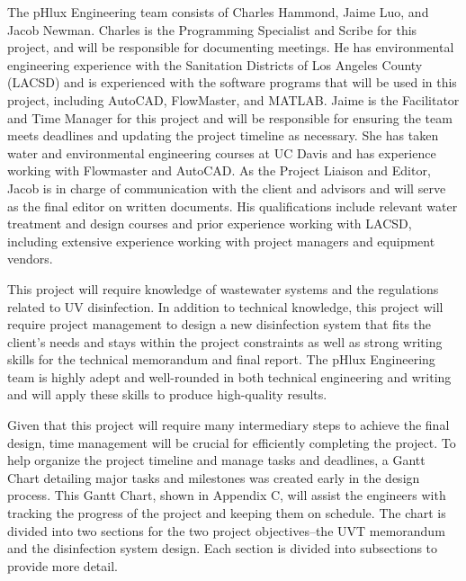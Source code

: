 \documentclass[11pt,letterpaper,final]{report}
\begin{document}
The pHlux Engineering team consists of Charles Hammond, Jaime Luo, and Jacob Newman. Charles is the Programming Specialist and Scribe for this project, and will be responsible for documenting meetings. He has environmental engineering experience with the Sanitation Districts of Los Angeles County (LACSD) and is experienced with  the software programs that will be used in this project, including AutoCAD, FlowMaster, and MATLAB. Jaime is the Facilitator and Time Manager for this project and will be responsible for ensuring the team meets deadlines and updating the project timeline as necessary. She has taken water and environmental engineering courses at UC Davis and has experience working with Flowmaster and AutoCAD. As the Project Liaison and Editor, Jacob is in charge of communication with the client and advisors and will serve as the final editor on written documents. His qualifications include relevant water treatment and design courses and prior experience working with LACSD, including extensive experience working with project managers and equipment vendors. 

This project will require knowledge of wastewater systems and the regulations related to UV disinfection. In addition to technical knowledge, this project will require project management to design a new disinfection system that fits the client’s needs and stays within the project constraints as well as strong writing skills for the technical memorandum and final report. The pHlux Engineering team is highly adept and well-rounded in both technical engineering and writing and will apply these skills to produce high-quality results.

Given that this project will require many intermediary steps to achieve the final design, time management will be crucial for efficiently completing the project. To help organize the project timeline and manage tasks and deadlines, a Gantt Chart detailing major tasks and milestones was created early in the design process. This Gantt Chart, shown in Appendix C, will assist the engineers with tracking the progress of the project and keeping them on schedule. The chart is divided into two sections for the two project objectives--the UVT memorandum and the disinfection system design. Each section is divided into subsections to provide more detail.



\end{document}
